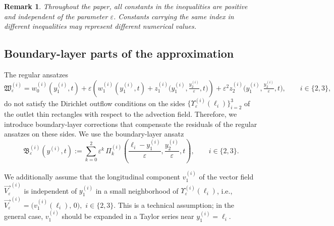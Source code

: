 \documentclass[reqno]{amsart}            %
\newtheorem{remark}{Remark}[section]
\numberwithin{equation}{section}
\begin{document}
	
	\begin{remark}
		Throughout the paper, all constants in the inequalities are positive and
		independent of the parameter $\varepsilon$.  
		Constants carrying the same index in different inequalities may represent
		different numerical values.
	\end{remark}
	
	\subsection{Boundary-layer parts of the approximation}\label{subsec_Bound_layer}
	
	The regular ansatzes
	\begin{equation}\label{regul-2+}
		\mathfrak{W}^{(i)}_\varepsilon =
		w_0^{(i)}(y^{(i)}_1,t)
		+ \varepsilon\left(w_1^{(i)}(y^{(i)}_1,t)
		+ z_1^{(i)}\!\Big(y^{(i)}_1,\tfrac{y^{(i)}_2}{\varepsilon},t\Big)\right)
		+ \varepsilon^2 z_2^{(i)}\!\Big(y^{(i)}_1,\tfrac{y^{(i)}_2}{\varepsilon},t\Big),
		\qquad i\in\{2,3\},
	\end{equation}
	do not satisfy the Dirichlet outflow conditions on the sides
	$\{\Upsilon_{\varepsilon}^{(i)}(\ell_i)\}_{i=2}^3$ of the outlet thin
	rectangles with respect to the advection field.  
	Therefore, we introduce boundary-layer corrections that compensate the
	residuals of the regular ansatzes on these sides.  
	We use the boundary-layer ansatz
	\begin{equation}\label{prim+}
		\mathfrak{B}^{(i)}_\varepsilon(y^{(i)},t)
		:= \sum_{k=0}^{2}\varepsilon^{k}\,
		\Pi_k^{(i)}\!\left(
		\frac{\ell_i - y^{(i)}_1}{\varepsilon},
		\frac{y^{(i)}_2}{\varepsilon},
		t
		\right),
		\qquad i\in\{2,3\}.
	\end{equation}
	
	We additionally assume that the longitudinal component $v_1^{(i)}$ of the
	vector field $\overrightarrow{V_\varepsilon}^{(i)}$ is independent of
	$y_1^{(i)}$ in a small neighborhood of $\Upsilon_{\varepsilon}^{(i)}(\ell_i)$,
	i.e.,
	$
	\overrightarrow{V_\varepsilon}^{(i)} = \big(v_1^{(i)}(\ell_i),\,0\big),$
	$ i\in\{2,3\}.$
	This is a technical assumption; in the general case, $v_1^{(i)}$ should be
	expanded in a Taylor series near $y_1^{(i)}=\ell_i$.
	
\end{document}
